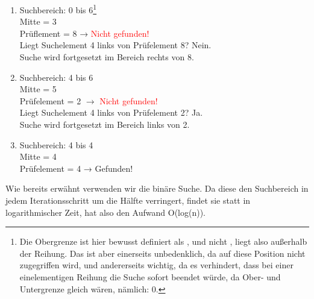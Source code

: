 \begin{aufgabe}
\begin{teile}
	\item 
	\begin{enumerate}
	\item Suchbereich: 0 bis 6\footnote{Die Obergrenze ist hier bewusst definiert als , und nicht , liegt also außerhalb der Reihung. Das ist aber einerseits unbedenklich, da auf diese Position nicht zugegriffen wird, und andererseits wichtig, da es verhindert, dass bei einer einelementigen Reihung die Suche sofort beendet würde, da Ober- und Untergrenze gleich wären, nämlich: 0.} \\
	Mitte = 3 \\
	Prüflement = 8 → \textcolor{red}{Nicht gefunden!} \\
	Liegt Suchelement 4 links von Prüfelement 8? Nein. \\
	Suche wird fortgesetzt im Bereich rechts von 8.
	\item Suchbereich: 4 bis 6 \\
	Mitte = 5 \\
	Prüfelement = 2 $\rightarrow$ \textcolor{red}{Nicht gefunden!} \\
	Liegt Suchelement 4 links von Prüfelement 2? Ja. \\
	Suche wird fortgesetzt im Bereich links von  2.
	\item Suchbereich: 4 bis 4 \\
	Mitte = 4 \\
	Prüfelement = 4 → \textcolor{green!50!black}{Gefunden!} \\
	\end{enumerate}
	
	\item
	Wie bereits erwähnt verwenden wir die binäre Suche. Da diese den Suchbereich in jedem Iterationsschritt um die Hälfte verringert, findet sie statt in logarithmischer Zeit, hat also den Aufwand O(log(n)).
	
\end{teile}	
\end{aufgabe}

